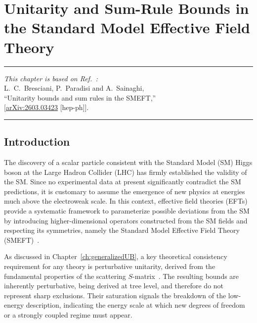 \chapter{Unitarity and Sum-Rule Bounds in the Standard Model Effective Field Theory\label{ch:SMEFT_bounds}}

\begin{flushright}
\small

{\color{chapterpaperrule}\rule{\textwidth}{0.5pt}}

\textit{This chapter is based on Ref.~\cite{Bresciani:2026acy}:}\\[0.5em]
L.~C.~Bresciani, P.~Paradisi and A.~Sainaghi,\\[0pt]
``Unitarity bounds and sum rules in the SMEFT,''\\[0pt]
[\href{https://doi.org/10.48550/arXiv.2603.03423}{arXiv:2603.03423} [hep-ph]].

{\color{chapterpaperrule}\rule{\textwidth}{0.5pt}}
\end{flushright}

\section{Introduction}

The discovery of a scalar particle consistent with the Standard Model (SM) Higgs boson at the Large Hadron Collider (LHC) has firmly
established the validity of the SM. Since no experimental data at present significantly contradict
the SM predictions, it is customary to assume the emergence of new physics at energies much above the
electroweak scale. In this context, effective field theories (EFTs) provide a systematic framework to parameterize possible
deviations from the SM by introducing higher-dimensional operators constructed from the SM fields and
respecting its symmetries, namely the
Standard Model Effective Field Theory (SMEFT)~\cite{Buchmuller:1985jz,Grzadkowski:2010es,Brivio:2017vri,Isidori:2023pyp,Aebischer:2025qhh}.

As discussed in Chapter~\ref{ch:generalizedUB}, a key theoretical consistency requirement for any theory
is perturbative unitarity, derived from the fundamental properties of the scattering
$S$-matrix~\cite{Jacob:1959at}. The resulting bounds are inherently perturbative, being derived at
tree level, and therefore do not represent sharp exclusions. Their saturation signals the breakdown
of the low-energy description, indicating the energy scale at which new degrees of freedom or a
strongly coupled regime must appear.

